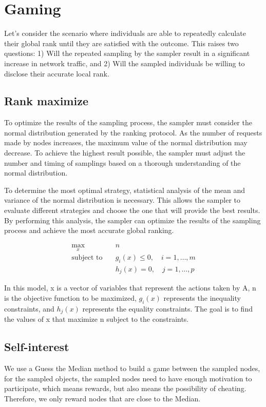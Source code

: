 \documentclass[twocolumn]{article}
\begin{document}
\section{Gaming}
Let's consider the scenario where individuals are able to repeatedly calculate their global rank until they are satisfied with the outcome. This raises two questions: 1) Will the repeated sampling by the sampler result in a significant increase in network traffic, and 2) Will the sampled individuals be willing to disclose their accurate local rank.
\subsection{Rank maximize}
To optimize the results of the sampling process, the sampler must consider the normal distribution generated by the ranking protocol. As the number of requests made by nodes increases, the maximum value of the normal distribution may decrease. To achieve the highest result possible, the sampler must adjust the number and timing of samplings based on a thorough understanding of the normal distribution.

To determine the most optimal strategy, statistical analysis of the mean and variance of the normal distribution is necessary. This allows the sampler to evaluate different strategies and choose the one that will provide the best results. By performing this analysis, the sampler can optimize the results of the sampling process and achieve the most accurate global ranking.

\begin{align}
  \max_x \quad & n \\
  \text{subject to} \quad & g_i(x) \leq 0, \quad i = 1, \dots, m \\
  & h_j(x) = 0, \quad j = 1, \dots, p
\end{align}

In this model, x is a vector of variables that represent the actions taken by A, n is the objective function to be maximized, $g_i(x)$ represents the inequality constraints, and $h_j(x)$ represents the equality constraints. The goal is to find the values of x that maximize n subject to the constraints.

\subsection{Self-interest}
We use a Guess the Median\cite{game_theory} method to build a game between the sampled nodes, for the sampled objects, the sampled nodes need to have enough motivation to participate, which means rewards, but also means the possibility of cheating. Therefore, we only reward nodes that are close to the Median.
\end{document}
